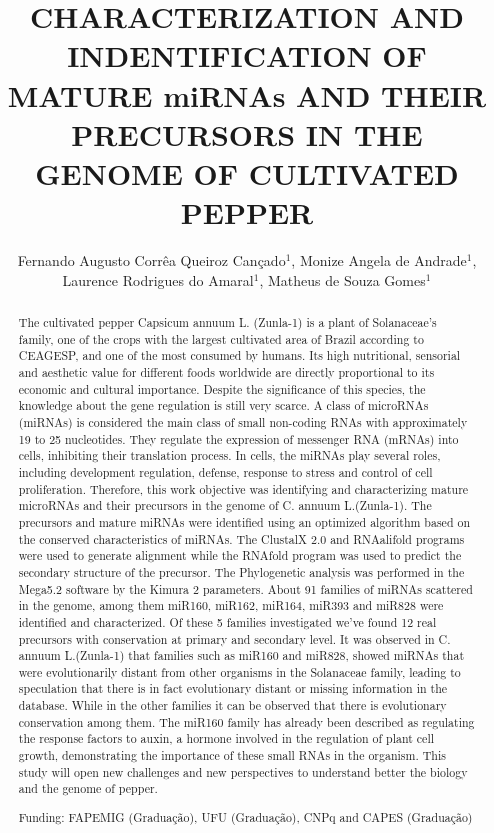 \documentclass[twoside]{article}
\title{\vspace{-15mm}\fontsize{24pt}{10pt}\selectfont\textbf{CHARACTERIZATION AND INDENTIFICATION OF MATURE miRNAs AND THEIR PRECURSORS IN THE GENOME OF CULTIVATED PEPPER}} %
\author{Fernando Augusto Corr\^ea Queiroz Can\c{c}ado$^1$, Monize Angela de Andrade$^1$, Laurence Rodrigues do Amaral$^1$, Matheus de Souza Gomes$^1$}
\affil{1 UFU\\ }
\date{}
\begin{document}
\maketitle %

\thispagestyle{fancy} %


\begin{abstract}
The cultivated pepper Capsicum annuum L. (Zunla-1) is a plant of Solanaceae's family, one of the crops with the largest cultivated area of Brazil according to CEAGESP, and one of the most consumed by humans. Its high nutritional, sensorial and aesthetic value for different foods worldwide are directly proportional to its economic and cultural importance. Despite the significance of this species, the knowledge about the gene regulation is still very scarce. A class of microRNAs (miRNAs) is considered the main class of small non-coding RNAs with approximately 19 to 25 nucleotides. They regulate the expression of messenger RNA (mRNAs) into cells, inhibiting their translation process. In cells, the miRNAs play several roles, including development regulation, defense, response to stress and control of cell proliferation. Therefore, this work objective was identifying and characterizing mature microRNAs and their precursors in the genome of C. annuum L.(Zunla-1). The precursors and mature miRNAs were identified using an optimized algorithm based on the conserved characteristics of miRNAs. The ClustalX 2.0 and RNAalifold programs were used to generate alignment while the RNAfold program was used to predict the secondary structure of the precursor. The Phylogenetic analysis was performed in the Mega5.2 software by the Kimura 2 parameters. About 91 families of miRNAs scattered in the genome, among them miR160, miR162, miR164, miR393 and miR828 were identified and characterized. Of these 5 families investigated we've found 12 real precursors with conservation at primary and secondary level. It was observed in C. annuum L.(Zunla-1) that families such as miR160 and miR828, showed miRNAs that were evolutionarily distant from other organisms in the Solanaceae family, leading to speculation that there is in fact evolutionary distant or missing information in the database. While in the other families it can be observed that there is evolutionary conservation among them. The miR160 family has already been described as regulating the response factors to auxin, a hormone involved in the regulation of plant cell growth, demonstrating the importance of these small RNAs in the organism. This study will open new challenges and new perspectives to understand better the biology and the genome of pepper.

Funding: FAPEMIG (Gradua\c{c}\~ao), UFU (Gradua\c{c}\~ao), CNPq and CAPES (Gradua\c{c}\~ao)
\end{abstract}
\end{document}
